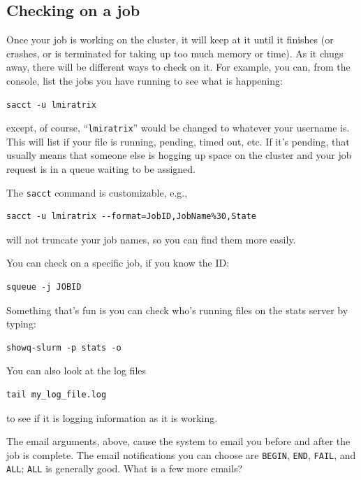 \documentclass[
]{book}
\begin{document}
\subsection{Checking on a job}\label{checking-on-a-job}

Once your job is working on the cluster, it will keep at it until it finishes (or crashes, or is terminated for taking up too much memory or time).
As it chugs away, there will be different ways to check on it.
For example, you can, from the console, list the jobs you have running to see what is happening:

\begin{verbatim}
sacct -u lmiratrix
\end{verbatim}

except, of course, ``\texttt{lmiratrix}'' would be changed to whatever your username is.
This will list if your file is running, pending, timed out, etc. If it's pending, that usually means that someone else is hogging up space on the cluster and your job request is in a queue waiting to be assigned.

The \texttt{sacct} command is customizable, e.g.,

\begin{verbatim}
sacct -u lmiratrix --format=JobID,JobName%30,State
\end{verbatim}

will not truncate your job names, so you can find them more easily.

You can check on a specific job, if you know the ID:

\begin{verbatim}
squeue -j JOBID
\end{verbatim}

Something that's fun is you can check who's running files on the stats server by typing:

\begin{verbatim}
showq-slurm -p stats -o
\end{verbatim}

You can also look at the log files

\begin{verbatim}
tail my_log_file.log
\end{verbatim}

to see if it is logging information as it is working.

The email arguments, above, cause the system to email you before and after the job is complete.
The email notifications you can choose are \texttt{BEGIN}, \texttt{END}, \texttt{FAIL}, and \texttt{ALL}; \texttt{ALL} is generally good. What is a few more emails?
\end{document}
